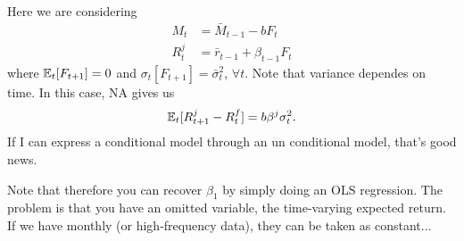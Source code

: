 Here we are considering
$$
\begin{aligned}
	M_t 	&= \bar{M}_{t-1} - bF_t\\
	R_t^j 	&= \bar{r}_{t-1} + \beta_{t-1} F_t
\end{aligned}
$$
where $\mathbb{E}_t[F_{t+1}] = 0$ and $\sigma_t[F_{t+1}] = \bar{\sigma}_t^2$, $\forall  t$. Note that variance dependes on time. In this case, NA gives us
$$
	\mathbb{E}_t[R_{t+1}^j - R_t^f] = b\beta^j\sigma_t^2.
$$
If I can express a conditional model through an un conditional model, that's good news.

Note that therefore you can recover $\beta_1$ by simply doing an OLS regression. The problem is that you have an omitted variable, the time-varying expected return. If we have monthly (or high-frequency data), they can be taken as constant... 

